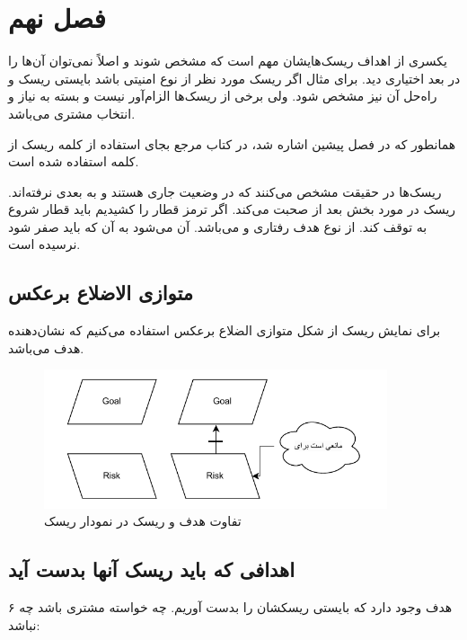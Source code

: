 \newpage

\section{فصل نهم}

یکسری از اهداف ریسک‌هایشان مهم است که مشخص شوند و اصلاً نمی‌توان آن‌ها را در بعد
اختیاری دید. برای مثال اگر ریسک مورد نظر از نوع امنیتی باشد بایستی ریسک و راه‌حل
آن نیز مشخص شود. ولی برخی از ریسک‌ها الزام‌آور نیست و بسته به نیاز و انتخاب
مشتری می‌باشد.

همانطور که در فصل پیشین اشاره شد، در کتاب مرجع بجای استفاده از کلمه ریسک از کلمه
 استفاده شده است.

ریسک‌ها در حقیقت مشخص می‌کنند که در وضعیت جاری هستند و به  بعدی
نرفته‌اند. ریسک در مورد بخش بعد از  صحبت می‌کند. اگر ترمز قطار را
کشیدیم باید قطار شروع به توقف کند. از نوع هدف رفتاری و  می‌باشد.
 آن می‌شود به آن  که باید صفر شود نرسیده است.

\subsection{متوازی الاضلاع برعکس}

برای نمایش ریسک از شکل متوازی الضلاع برعکس استفاده می‌کنیم که نشان‌دهنده
 هدف می‌باشد.

\begin{figure}[H]
    \centering
    \includegraphics[width=0.9\textwidth]{assets/goal_vs_risk.drawio.pdf}
    \caption{تفاوت هدف و ریسک در نمودار ریسک}
\end{figure}

\subsection{اهدافی که باید ریسک آنها بدست آید}

۶ هدف وجود دارد که بایستی ریسکشان را بدست آوریم. چه خواسته مشتری باشد چه نباشد:

